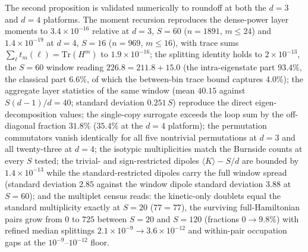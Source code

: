 The second proposition is validated numerically to roundoff at both the
$d=3$ and $d=4$ platforms. The moment recursion reproduces the dense-power
layer moments to $3.4\times10^{-16}$ relative at $d=3$, $S=60$
($n=1891$, $m\le24$) and $1.4\times10^{-19}$ at $d=4$, $S=16$
($n=969$, $m\le16$), with trace sums $\sum_{\ell}t_m(\ell)=
\mathrm{Tr}(H^{m})$ to $1.9\times10^{-16}$; the splitting identity holds
to $2\times10^{-13}$, the $S=60$ window reading
$226.8=211.8+15.0$ (the intra-eigenstate part $93.4\%$, the classical
part $6.6\%$, of which the between-bin trace bound captures $4.0\%$); the
aggregate layer statistics of the same window (mean $40.15$ against
$S(d-1)/d=40$; standard deviation $0.251\,S$) reproduce the direct
eigen-decomposition values; the single-copy surrogate exceeds the loop sum
by the off-diagonal fraction $31.8\%$ ($35.4\%$ at the $d=4$ platform);
the permutation commutators vanish identically for all five nontrivial
permutations at $d=3$ and all twenty-three at $d=4$; the isotypic
multiplicities match the Burnside counts at every $S$ tested; the
trivial- and sign-restricted dipoles $\langle K\rangle-S/d$ are bounded
by $1.4\times10^{-13}$ while the standard-restricted dipoles carry the
full window spread (standard deviation $2.85$ against the window dipole
standard deviation $3.88$ at $S=60$); and the multiplet census reads:
the kinetic-only doublets equal the standard multiplicity exactly at
$S=20$ ($77=77$), the surviving full-Hamiltonian pairs grow from $0$ to
$725$ between $S=20$ and $S=120$ (fractions $0\to9.8\%$) with refined
median splittings $2.1\times10^{-9}\to3.6\times10^{-12}$ and
within-pair occupation gaps at the $10^{-9}$--$10^{-12}$ floor.

